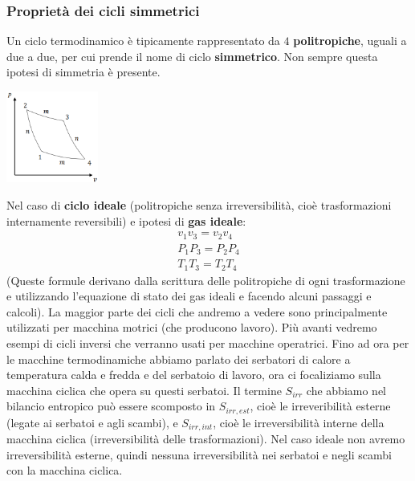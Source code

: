 \subsubsection{Proprietà dei cicli simmetrici}
Un ciclo termodinamico è tipicamente rappresentato da $4$ \textbf{politropiche}, uguali a due a due, per cui prende il nome di ciclo \textbf{simmetrico}. Non sempre questa ipotesi di simmetria è presente.
\begin{center}
    \includegraphics[height=3cm]{../L07/img1.PNG}
\end{center}
Nel caso di \textbf{ciclo ideale} (politropiche senza irreversibilità, cioè trasformazioni internamente reversibili) e ipotesi di \textbf{gas ideale}:
\[
    \begin{matrix}
        v_1v_3 = v_2v_4\\
        P_1P_3 = P_2P_4\\
        T_1T_3 = T_2T_4
    \end{matrix}
\]
(Queste formule derivano dalla scrittura delle politropiche di ogni trasformazione e utilizzando l'equazione di stato dei gas ideali e facendo alcuni passaggi e calcoli).\newline
\newline
La maggior parte dei cicli che andremo a vedere sono principalmente utilizzati per macchina motrici (che producono lavoro). Più avanti vedremo esempi di cicli inversi che verranno usati per macchine operatrici.\newline
\newline
Fino ad ora per le macchine termodinamiche abbiamo parlato dei serbatori di calore a temperatura calda e fredda e del serbatoio di lavoro, ora ci focaliziamo sulla macchina ciclica che opera su questi serbatoi.\newline
\newline
Il termine $S_{irr}$ che abbiamo nel bilancio entropico può essere scomposto in $S_{irr,est}$, cioè le irreveribilità esterne (legate ai serbatoi e agli scambi), e $S_{irr, int}$, cioè le irreversibilità interne della macchina ciclica (irreversibilità delle trasformazioni). Nel caso ideale non avremo irreversibilità esterne, quindi nessuna irreversibilità nei serbatoi e negli scambi con la macchina ciclica. 
